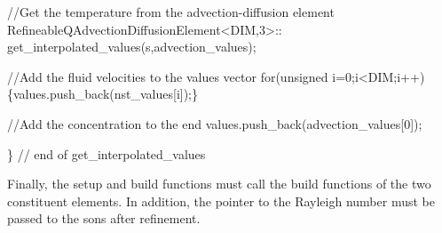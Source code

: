 \begin{DoxyCodeInclude}
   \textcolor{comment}{//Get the temperature from the advection-diffusion element}
   RefineableQAdvectionDiffusionElement<DIM,3>::
    get\_interpolated\_values(s,advection\_values);

   \textcolor{comment}{//Add the fluid velocities to the values vector}
   \textcolor{keywordflow}{for}(\textcolor{keywordtype}{unsigned} i=0;i<DIM;i++) \{values.push\_back(nst\_values[i]);\}   

   \textcolor{comment}{//Add the concentration to the end}
   values.push\_back(advection\_values[0]);

  \} \textcolor{comment}{// end of get\_interpolated\_values}

\end{DoxyCodeInclude}


Finally, the setup and build functions must call the build functions of the two constituent elements. In addition, the pointer to the Rayleigh number must be passed to the sons after refinement.

